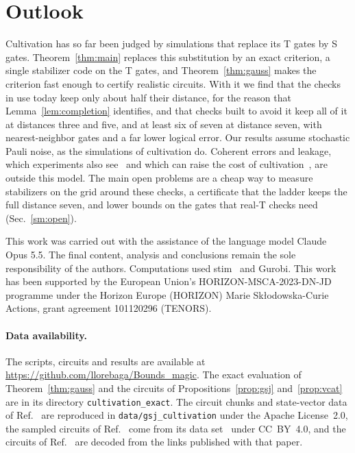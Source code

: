 \documentclass[aps,prl,reprint,twocolumn,amsmath,amssymb,floatfix,nofootinbib,superscriptaddress]{revtex4-2}
\theoremstyle{definition}
\theoremstyle{remark}
\begin{document}
%
\section{Outlook}
Cultivation has so far been judged by simulations that replace its T gates by S gates. Theorem~\ref{thm:main} replaces this substitution by an exact criterion, a single stabilizer code on the T gates, and Theorem~\ref{thm:gauss} makes the criterion fast enough to certify realistic circuits. With it we find that the checks in use today keep only about half their distance, for the reason that Lemma~\ref{lem:completion} identifies, and that checks built to avoid it keep all of it at distances three and five, and at least six of seven at distance seven, with nearest-neighbor gates and a far lower logical error. Our results assume stochastic Pauli noise, as the simulations of cultivation do. Coherent errors and leakage, which experiments also see~\cite{googlecultivation} and which can raise the cost of cultivation~\cite{hines}, are outside this model. The main open problems are a cheap way to measure stabilizers on the grid around these checks, a certificate that the ladder keeps the full distance seven, and lower bounds on the gates that real-T checks need (Sec.~\ref{sm:open}).

\begin{acknowledgments}
This work was carried out with the assistance of the language model Claude Opus 5.5. The final content, analysis and conclusions remain the sole responsibility of the authors. Computations used stim~\cite{stim} and Gurobi. This work has been supported by the European Union's HORIZON-MSCA-2023-DN-JD programme under the Horizon Europe (HORIZON) Marie Sk\l{}odowska-Curie Actions, grant agreement 101120296 (TENORS).
\end{acknowledgments}

\paragraph*{Data availability.}
The scripts, circuits and results are available at \url{https://github.com/llorebaga/Bounds_magic}. The exact evaluation of Theorem~\ref{thm:gauss} and the circuits of Propositions~\ref{prop:gsj} and~\ref{prop:vcat} are in its directory \texttt{cultivation\_exact}. The circuit chunks and state-vector data of Ref.~\cite{gsjcode} are reproduced in \texttt{data/gsj\_cultivation} under the Apache License~2.0, the sampled circuits of Ref.~\cite{cultivation} come from its data set~\cite{gsjzenodo} under CC~BY~4.0, and the circuits of Ref.~\cite{googlecultivation} are decoded from the links published with that paper.
\end{document}
